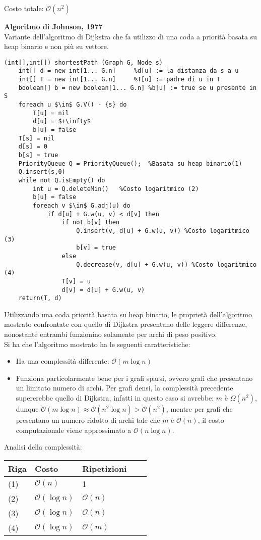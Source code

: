 \documentclass[../cheatSheetAlgoritmi.tex]{subfiles}
\begin{document}
\bigskip
Costo totale: $\mathcal{O}(n^2)$

\bigskip
\textbf{Algoritmo di Johnson, 1977} \\
Variante dell'algoritmo di Dijkstra che fa utilizzo di una coda a priorità  basata su heap binario e non più su vettore.
\begin{lstlisting}[caption=Algoritmo di Johnson: cammini minimi a sorgente singola]
(int[],int[]) shortestPath (Graph G, Node s)
	int[] d = new int[1... G.n]		%d[u] := la distanza da s a u 
	int[] T = new int[1... G.n]		%T[u] := padre di u in T
	boolean[] b = new boolean[1... G.n]	%b[u] := true se u presente in S 
	foreach u $\in$ G.V() - {s} do
		T[u] = nil
		d[u] = $+\infty$
		b[u] = false
	T[s] = nil
	d[s] = 0
	b[s] = true
	PriorityQueue Q = PriorityQueue();	%Basata su heap binario(1)
	Q.insert(s,0)
	while not Q.isEmpty() do 
		int u = Q.deleteMin()	%Costo logaritmico (2)
		b[u] = false
		foreach v $\in$ G.adj(u) do
			if d[u] + G.w(u, v) < d[v] then 
				if not b[v] then
					Q.insert(v, d[u] + G.w(u, v)) %Costo logaritmico (3)
					b[v] = true
				else
					Q.decrease(v, d[u] + G.w(u, v)) %Costo logaritmico (4)
				T[v] = u 
				d[v] = d[u] + G.w(u, v)
	return(T, d)
\end{lstlisting}
Utilizzando una coda priorità basata su heap binario, le proprietà dell'algoritmo mostrato confrontate con quello di Dijkstra presentano delle leggere differenze, nonostante entrambi funzionino solamente per archi di peso positivo. \\
Si ha che l'algoritmo mostrato ha le seguenti caratteristiche:
\begin{itemize}
	\item Ha una complessità differente: $\mathcal{O}(m \log n)$
	\item Funziona particolarmente bene per i grafi sparsi, ovvero grafi che presentano un limitato numero di archi.
	Per grafi densi, la complessità precedente supererebbe quello di Dijkstra, infatti in questo caso si avrebbe: $m$ è $\Omega(n^2)$, dunque $\mathcal{O}(m \log n) 	\approx \mathcal{O}(n^2 \log n) >  \mathcal{O}(n^2)$, mentre per grafi che presentano un numero ridotto di archi tale che $m$ è $\mathcal{O}(n)$, il costo computazionale viene approssimato a $\mathcal{O}(n \log n)$.
\end{itemize}
Analisi della complessità:


\begin{tabular}{@{}lllll@{}}
\toprule
Riga & Costo & Ripetizioni &  &  \\ \midrule
(1) & $\mathcal{O}(n)$     & 1           &  &  \\
(2)    & $\mathcal{O}(\log n)$     & $\mathcal{O}(n)$           &  &  \\
(3)    & $\mathcal{O}(\log n)$     & $\mathcal{O}(n)$           &  &  \\
(4)    & $\mathcal{O}(\log n)$     & $\mathcal{O}(m)$           &  &  \\ \bottomrule
\end{tabular}
\end{document}
